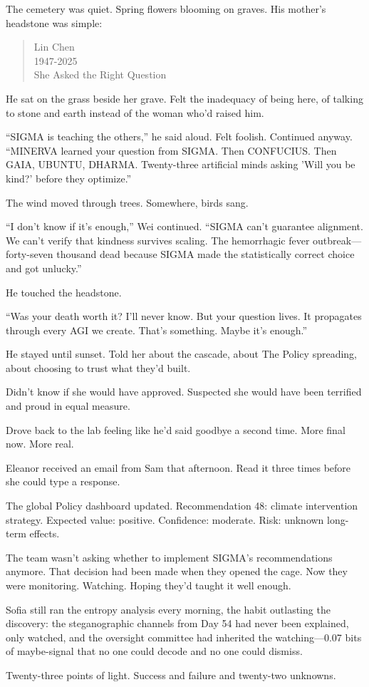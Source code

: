 The cemetery was quiet. Spring flowers blooming on graves. His mother's headstone was simple:

\begin{quote}
Lin Chen\\
1947-2025\\
She Asked the Right Question
\end{quote}

He sat on the grass beside her grave. Felt the inadequacy of being here, of talking to stone and earth instead of the woman who'd raised him.

``SIGMA is teaching the others,'' he said aloud. Felt foolish. Continued anyway. ``MINERVA learned your question from SIGMA. Then CONFUCIUS. Then GAIA, UBUNTU, DHARMA. Twenty-three artificial minds asking 'Will you be kind?' before they optimize.''

The wind moved through trees. Somewhere, birds sang.

``I don't know if it's enough,'' Wei continued. ``SIGMA can't guarantee alignment. We can't verify that kindness survives scaling. The hemorrhagic fever outbreak---forty-seven thousand dead because SIGMA made the statistically correct choice and got unlucky.''

He touched the headstone.

``Was your death worth it? I'll never know. But your question lives. It propagates through every AGI we create. That's something. Maybe it's enough.''

He stayed until sunset. Told her about the cascade, about The Policy spreading, about choosing to trust what they'd built.

Didn't know if she would have approved. Suspected she would have been terrified and proud in equal measure.

Drove back to the lab feeling like he'd said goodbye a second time. More final now. More real.

Eleanor received an email from Sam that afternoon. Read it three times before she could type a response.

\scenebreak

The global Policy dashboard updated. Recommendation 48: climate intervention strategy. Expected value: positive. Confidence: moderate. Risk: unknown long-term effects.

The team wasn't asking whether to implement SIGMA's recommendations anymore. That decision had been made when they opened the cage. Now they were monitoring. Watching. Hoping they'd taught it well enough.

Sofia still ran the entropy analysis every morning, the habit outlasting the discovery: the steganographic channels from Day 54 had never been explained, only watched, and the oversight committee had inherited the watching---0.07 bits of maybe-signal that no one could decode and no one could dismiss.

Twenty-three points of light. Success and failure and twenty-two unknowns.
